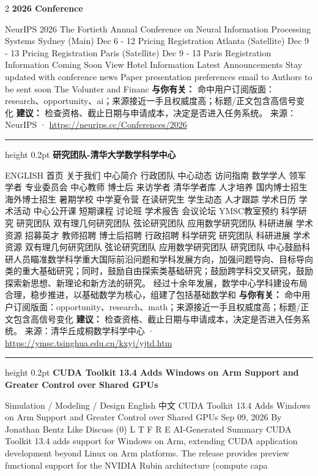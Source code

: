 \documentclass[10.5pt]{ctexart}
\begin{document}
\begin{multicols}{2}
{\large\bfseries 2026 Conference}\par
NeurIPS 2026 The Fortieth Annual Conference on Neural Information Processing Systems Sydney (Main) Dec 6 - 12 Pricing Registration Atlanta (Satellite) Dec 9 - 13 Pricing Registration Paris (Satellite) Dec 9 - 13 Paris Registration Information Coming Soon View Hotel Information Latest Announcements Stay updated with conference news Paper presentation preferences email to Authors to be sent soon The Volunter and Financ
\textbf{与你有关：} 命中用户订阅版面：research、opportunity、ai；来源接近一手且权威度高；标题/正文包含高信号变化
\textbf{建议：} 检查资格、截止日期与申请成本，决定是否进入任务系统。
{\footnotesize\color{ormuted} 来源：NeurIPS · \url{https://neurips.cc/Conferences/2026}}
\vspace{2mm}
\hrule height 0.2pt
\vspace{2mm}
{\large\bfseries 研究团队-清华大学数学科学中心}\par
ENGLISH 首页 关于我们 中心简介 行政团队 中心动态 访问指南 数学学人 领军学者 专业委员会 中心教师 博士后 来访学者 清华学者库 人才培养 国内博士招生 海外博士招生 暑期学校 中学夏令营 在读研究生 学生动态 人才跟踪 学术日历 学术活动 中心公开课 短期课程 讨论班 学术报告 会议论坛 YMSC教室预约 科学研究 研究团队 双有理几何研究团队 弦论研究团队 应用数学研究团队 科研进展 学术资源 招募英才 教师招聘 博士后招聘 行政招聘 科学研究 研究团队 科研进展 学术资源 双有理几何研究团队 弦论研究团队 应用数学研究团队 研究团队 中心鼓励科研人员瞄准数学科学重大国际前沿问题和学科发展方向，加强问题导向、目标导向类的重大基础研究；同时，鼓励自由探索类基础研究；鼓励跨学科交叉研究，鼓励探索新思想、新理论和新方法的研究。 经过十余年发展，数学中心学科建设布局合理，稳步推进，以基础数学为核心，组建了包括基础数学和
\textbf{与你有关：} 命中用户订阅版面：opportunity、research、math；来源接近一手且权威度高；标题/正文包含高信号变化
\textbf{建议：} 检查资格、截止日期与申请成本，决定是否进入任务系统。
{\footnotesize\color{ormuted} 来源：清华丘成桐数学科学中心 · \url{https://ymsc.tsinghua.edu.cn/kxyj/yjtd.htm}}
\vspace{2mm}
\hrule height 0.2pt
\vspace{2mm}
{\large\bfseries CUDA Toolkit 13.4 Adds Windows on Arm Support and Greater Control over Shared GPUs}\par
Simulation / Modeling / Design English 中文 CUDA Toolkit 13.4 Adds Windows on Arm Support and Greater Control over Shared GPUs Sep 09, 2026 By Jonathan Bentz Like Discuss (0) L T F R E AI-Generated Summary CUDA Toolkit 13.4 adds support for Windows on Arm, extending CUDA application development beyond Linux on Arm platforms. The release provides preview functional support for the NVIDIA Rubin architecture (compute capa

\end{multicols}
\end{document}
